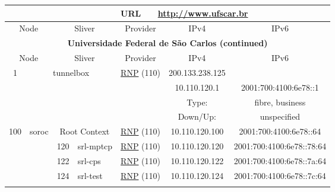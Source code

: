 \begin{small}
\begin{center}
\begin{longtable}{|c|c|c|c|c|c|c|c|}
 \multicolumn{4}{|c|}{} & \multicolumn{1}{|l|}{URL} & \multicolumn{3}{|l|}{\url{http://www.ufscar.br}} \\ \hline
 \multicolumn{2}{|p{8em}|}{Node} & \multicolumn{2}{|p{8em}|}{Sliver} & \multicolumn{2}{|p{8em}|}{Provider} & IPv4 & IPv6 \\ \hline
\endfirsthead
\hline
 \multicolumn{8}{|c|}{\textbf{Universidade Federal de São Carlos (continued)}} \\ \hline
 \multicolumn{2}{|p{8em}|}{Node} & \multicolumn{2}{|p{8em}|}{Sliver} & \multicolumn{2}{|p{8em}|}{Provider} & IPv4 & IPv6 \\ \hline
\endhead
 \multirow{4}{*}{\tiny{1}} & \multicolumn{3}{|c|}{\multirow{4}{*}{\tiny{tunnelbox}}} & \multicolumn{2}{|c|}{\multirow{4}{*}{\tiny{\href{https://www.rnp.br}{RNP} (110)}}} & \tiny{200.133.238.125} & \frownie{} \\* \cline{7-7}\cline{8-8}
  & \multicolumn{3}{|c|}{} & \multicolumn{2}{|c|}{} & \tiny{10.110.120.1} & \tiny{2001:700:4100:6e78::1} \\* \cline{7-7}\cline{8-8}
  & \multicolumn{3}{|c|}{} & \multicolumn{2}{|c|}{} & Type: & fibre, business \\* \cline{7-7}\cline{8-8}
  & \multicolumn{3}{|c|}{} & \multicolumn{2}{|c|}{} & Down/Up:  & unspecified \\ \hline
 \multirow{9}{*}{\tiny{100}} & \multicolumn{1}{|l|}{\multirow{9}{*}{\tiny{soroc}}} & \multicolumn{2}{|c|}{\tiny{Root Context}} & \multicolumn{2}{|c|}{\tiny{\href{https://www.rnp.br}{RNP} (110)}} & \tiny{10.110.120.100} & \tiny{2001:700:4100:6e78::64} \\* \cline{3-3}\cline{4-4}\cline{5-5}\cline{6-6}\cline{7-7}\cline{8-8}
  &  & \tiny{120} & \multicolumn{1}{|l|}{\tiny{srl-mptcp}} & \multicolumn{2}{|c|}{\tiny{\href{https://www.rnp.br}{RNP} (110)}} & \tiny{10.110.120.120} & \tiny{2001:700:4100:6e78::78:64} \\* \cline{3-3}\cline{4-4}\cline{5-5}\cline{6-6}\cline{7-7}\cline{8-8}
  &  & \tiny{122} & \multicolumn{1}{|l|}{\tiny{srl-cps}} & \multicolumn{2}{|c|}{\tiny{\href{https://www.rnp.br}{RNP} (110)}} & \tiny{10.110.120.122} & \tiny{2001:700:4100:6e78::7a:64} \\* \cline{3-3}\cline{4-4}\cline{5-5}\cline{6-6}\cline{7-7}\cline{8-8}
  &  & \tiny{124} & \multicolumn{1}{|l|}{\tiny{srl-test}} & \multicolumn{2}{|c|}{\tiny{\href{https://www.rnp.br}{RNP} (110)}} & \tiny{10.110.120.124} & \tiny{2001:700:4100:6e78::7c:64} \\* \cline{3-3}\cline{4-4}\cline{5-5}\cline{6-6}\cline{7-7}\cline{8-8}

\end{longtable}
\end{center}
\end{small}
